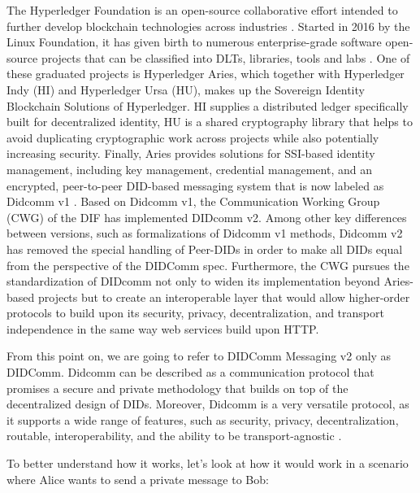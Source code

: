 The Hyperledger Foundation is an open-source collaborative effort intended to further develop blockchain technologies across industries \cite{jones_boswell_2022}. Started in 2016 by the Linux Foundation, it has given birth to numerous enterprise-grade software open-source projects that can be classified into DLTs, libraries, tools and labs \cite{lusard_lehors_muscara_boswell_zsigri_2021}. One of these graduated projects is Hyperledger Aries, which together with Hyperledger Indy (HI) and Hyperledger Ursa (HU), makes up the Sovereign Identity Blockchain Solutions of Hyperledger. HI supplies a distributed ledger specifically built for decentralized identity, HU is a shared cryptography library that helps to avoid duplicating cryptographic work across projects while also potentially increasing security. Finally, Aries provides solutions for SSI-based identity management, including key management, credential management, and an encrypted, peer-to-peer DID-based messaging system that is now labeled as Didcomm v1 \cite{jones_boswell_2022}. 
Based on Didcomm v1, the Communication Working Group (CWG) of the DIF has implemented DIDcomm v2. Among other key differences between versions, such as formalizations of Didcomm v1 methods, Didcomm v2 has removed the special handling of Peer-DIDs in order to make all DIDs equal from the perspective of the DIDComm spec. Furthermore, the CWG pursues the standardization of DIDcomm not only to widen its implementation beyond Aries-based projects but to create an interoperable layer that would allow higher-order protocols to build upon its security, privacy, decentralization, and transport independence in the same way web services build upon HTTP. \cite{young_2020} \cite{curren_looker_terbu_2020}

From this point on, we are going to refer to DIDComm Messaging v2 only as DIDComm. Didcomm can be described as a communication protocol that promises a secure and private methodology that builds on top of the decentralized design of DIDs. Moreover, Didcomm is a very versatile protocol, as it supports a wide range of features, such as security, privacy, decentralization, routable, interoperability, and the ability to be transport-agnostic \cite{curren_looker_terbu_2020}.

To better understand how it works, let's look at how it would work in a scenario where Alice wants to send a private message to Bob: 

